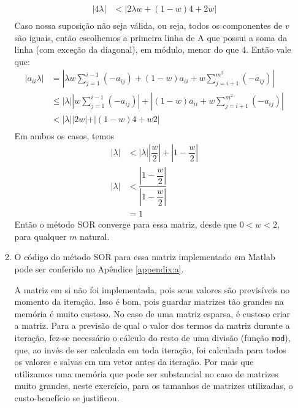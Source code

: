 \documentclass{article}
\begin{document}
\begin{enumerate}
\begin{enumerate}
\begin{align*}
                        |4 \lambda| &< \left|2\lambda w + (1-w)4 + 2w\right| \\
                    \end{align*}
                    Caso nossa suposição não seja válida, ou seja, todos os componentes de $v$ são iguais, então escolhemos a primeira linha de A
                    que possui a soma da linha (com exceção da diagonal), em módulo, menor do que 4. Então vale que:
                    \begin{align*}
                        |a_{ii} \lambda| &= \left|\lambda w \sum_{j=1}^{i-1} (-a_{ij}) + (1-w)a_{ii} + w \sum_{j=i+1}^{m^2} (-a_{ij})\right| \\
                        &\le |\lambda| \left| w \sum_{j=1}^{i-1} (-a_{ij})\right| + \left|(1-w)a_{ii} + w \sum_{j=i+1}^{m^2} (-a_{ij})\right| \\
                        &< |\lambda| \left|2 w| + |(1-w)4 + w 2\right| \\
                    \end{align*}
                    Em ambos os casos, temos
                    \begin{align*}
                        |\lambda| &< |\lambda| \left|\dfrac{w}{2}\right| + \left|1 - \dfrac{w}{2}\right| \\
                        |\lambda| &< \dfrac{\left|1 - \dfrac{w}{2}\right|}{\left|1 - \dfrac{w}{2}\right|} \\
                        &= 1
                    \end{align*}
                    Então o método SOR converge para essa matriz, desde que $0 < w < 2$, para qualquer $m$ natural.

                \item O código do método SOR para essa matriz implementado em Matlab pode ser conferido no Apêndice \ref{appendix:a}.
                
                    A matriz em si não foi implementada, pois seus valores são previsíveis no momento da iteração.
                    Isso é bom, pois guardar matrizes tão grandes na memória é muito custoso.
                    No caso de uma matriz esparsa, é custoso criar a matriz.
                    Para a previsão de qual o valor dos termos da matriz durante a iteração, fez-se necessário
                    o cálculo do resto de uma divisão (função \lstinline{mod}), que, ao invés de ser calculada em toda iteração,
                    foi calculada para todos os valores e salvas em um vetor antes da iteração. Por mais que utilizamos uma memória que pode
                    ser substancial no caso de matrizes muito grandes, neste exercício,
                    para os tamanhos de matrizes utilizadas, o custo-benefício se justificou.


\end{enumerate}
\end{enumerate}
\end{document}
